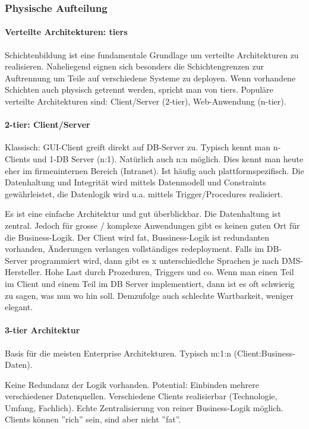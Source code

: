 \subsubsection{Physische Aufteilung}
\paragraph{Verteilte Architekturen: tiers} Schichtenbildung ist eine fundamentale Grundlage um verteilte Architekturen zu realisieren. Naheliegend eignen sich besonders die Schichtengrenzen zur Auftrennung um Teile auf verschiedene Systeme zu deployen. Wenn vorhandene Schichten auch physisch getrennt werden, spricht man von tiers. Populäre verteilte Architekturen sind: Client/Server (2-tier), Web-Anwendung (n-tier).

\paragraph{2-tier: Client/Server}
Klassisch: GUI-Client greift direkt auf DB-Server zu. Typisch kennt man n-Clients und 1-DB Server (n:1). Natürlich auch n:n möglich. Dies kennt man heute eher im firmeninternen Bereich (Intranet). Ist häufig auch plattformspezifisch. Die Datenhaltung und Integrität wird mittels Datenmodell und Constraints gewährleistet, die Datenlogik wird u.a. mittels Trigger/Procedures realisiert.

Es ist eine einfache Architektur und gut überblickbar. Die Datenhaltung ist zentral. Jedoch für grosse / komplexe Anwendungen gibt es keinen guten Ort für die Business-Logik. Der Client wird fat, Bussiness-Logik ist redundanten vorhanden, Änderungen verlangen vollständiges redeployment. Falls im DB-Server programmiert wird, dann gibt es x unterschiedlche Sprachen je nach DMS-Hersteller. Hohe Last durch Prozeduren, Triggers und co. Wenn man einen Teil im Client und einem Teil im DB Server implementiert, dann ist es oft schwierig zu sagen, was nun wo hin soll. Demzufolge auch schlechte Wartbarkeit, weniger elegant.

\paragraph{3-tier Architektur}
Basis für die meisten Enterprise Architekturen. Typisch m:1:n (Client:Business-Daten).

Keine Redundanz der Logik vorhanden. Potential: Einbinden mehrere verschiedener Datenquellen. Verschiedene Clients realisierbar (Technologie, Umfang, Fachlich). Echte Zentralisierung von reiner Business-Logik möglich. Clients können ''rich'' sein, sind aber nicht ''fat''.


